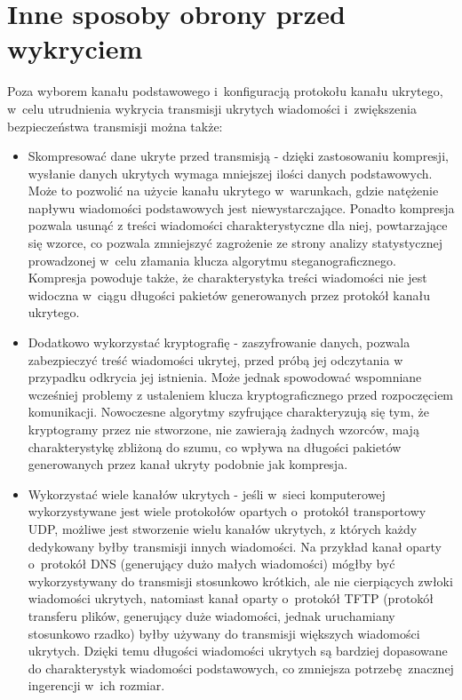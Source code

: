 \documentclass[a4paper, twoside, openright, 12pt]{report}
\begin{document}
    \section{Inne sposoby obrony przed wykryciem}
       Poza wyborem kanału podstawowego i~konfiguracją protokołu kanału ukrytego,
       w~celu utrudnienia wykrycia transmisji ukrytych wiadomości i~zwiększenia
       bezpieczeństwa transmisji można także:
       \begin{itemize}
           \item Skompresować dane ukryte przed transmisją - dzięki zastosowaniu
               kompresji, wysłanie danych ukrytych wymaga mniejszej ilości
               danych podstawowych. Może to pozwolić na użycie kanału ukrytego
               w~warunkach, gdzie natężenie napływu wiadomości podstawowych
               jest niewystarczające. Ponadto kompresja pozwala usunąć z treści
               wiadomości charakterystyczne dla niej, powtarzające się wzorce,
               co pozwala zmniejszyć zagrożenie ze strony analizy statystycznej
               prowadzonej w~celu złamania klucza algorytmu steganograficznego.
               Kompresja powoduje także, że charakterystyka treści wiadomości nie jest widoczna
               w~ciągu długości pakietów generowanych przez protokół kanału ukrytego.
           \item Dodatkowo wykorzystać kryptografię - zaszyfrowanie danych, pozwala
               zabezpieczyć treść wiadomości ukrytej, przed próbą jej odczytania w
               przypadku odkrycia jej istnienia. Może jednak spowodować wspomniane
               wcześniej problemy z ustaleniem klucza kryptograficznego przed rozpoczęciem
               komunikacji. Nowoczesne algorytmy szyfrujące charakteryzują się
               tym, że kryptogramy przez nie stworzone, nie zawierają żadnych wzorców,
               mają charakterystykę zbliżoną do szumu, co wpływa na długości pakietów
               generowanych przez kanał ukryty podobnie jak kompresja.
           \item Wykorzystać wiele kanałów ukrytych - jeśli w~sieci komputerowej
               wykorzystywane jest wiele protokołów opartych o~protokół transportowy UDP,
               możliwe jest stworzenie wielu kanałów ukrytych, z których każdy dedykowany
               byłby transmisji innych wiadomości. Na przykład kanał oparty o~protokół
               DNS (generujący dużo małych wiadomości)  mógłby być wykorzystywany
               do transmisji stosunkowo krótkich, ale nie cierpiących zwłoki wiadomości
               ukrytych, natomiast kanał oparty o~protokół TFTP (protokół transferu plików,
               generujący duże wiadomości, jednak uruchamiany stosunkowo rzadko)
               byłby używany do transmisji większych wiadomości ukrytych. Dzięki
               temu długości wiadomości ukrytych są bardziej dopasowane do charakterystyk
               wiadomości podstawowych, co zmniejsza potrzebę znacznej ingerencji
               w~ich rozmiar.


\end{itemize}
\end{document}
